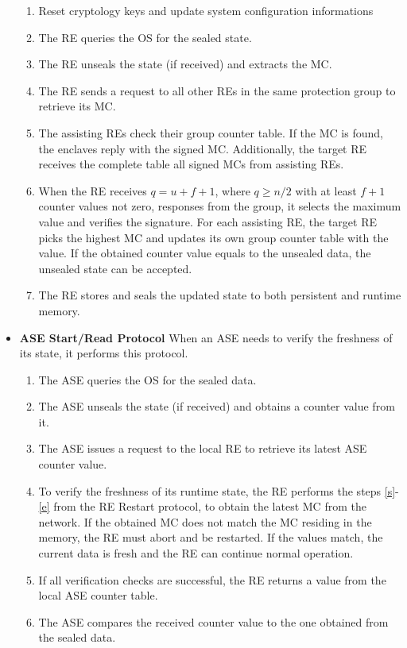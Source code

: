 \begin{itemize}
	\begin{enumerate}
		\item Reset cryptology keys and update system configuration informations
		\item The RE queries the OS for the sealed state.
		\item The RE unseals the state (if received) and extracts the MC.
		\item \label{s}The RE sends a request to all other REs in the same protection group to retrieve its MC.
		\item The assisting REs check their group counter table. If the MC is found, the enclaves reply with the signed MC. Additionally, the target RE receives the complete table all signed MCs from assisting REs.
		\item \label{e}When the RE receives $q=u+f+1$, where $q \ge n/2$ with at least $f+1$ counter values not zero, responses from the group, it selects the maximum value and verifies the signature. For each assisting RE, the target RE picks the highest MC and updates its own group counter table with the value. If the obtained counter value equals to the unsealed data, the unsealed state can be accepted.
		\item The RE stores and seals the updated state to both persistent and runtime memory.
		\end{enumerate}
	\item \textbf{ASE Start/Read Protocol} When an ASE needs to verify the freshness of its state, it performs this protocol.
	\begin{enumerate}
		\item The ASE queries the OS for the sealed data.
		\item The ASE unseals the state (if received) and obtains a counter value from it.
		\item The ASE issues a request to the local RE to retrieve its latest ASE counter value.
		\item To verify the freshness of its runtime state, the RE performs the steps \ref{s}-\ref{e} from the RE Restart protocol, to obtain the latest MC from the network. If the obtained MC does not match the MC residing in the memory, the RE must abort and be restarted. If the values match, the current data is fresh and the RE can continue normal operation.
		\item If all verification checks are successful, the RE returns a value from the local ASE counter table.
		\item The ASE compares the received counter value to the one obtained from the sealed data.
	\end{enumerate}
\end{itemize} 

